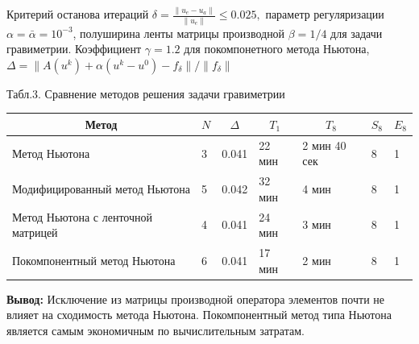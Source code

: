 \documentclass[10pt,pdf, mathserif, hyperref={unicode}]{beamer}
\begin{document}
\begin{frame}
	Критерий останова итераций 
	$\delta=\frac{\|u_e-u_a\|}{\|u_e\|}\le 0.025,$ параметр регуляризации $\alpha=\bar{\alpha}=10^{-3}$, полуширина ленты матрицы производной $\beta=1/4$ для задачи гравиметрии. Коэффициент $\gamma=1.2$ для покомпонетного метода Ньютона, $\Delta=\|A(u^k)+\alpha(u^k-u^0)-f_\delta\|/\|f_\delta\|$
	
	\begin{table}[]
		\centering
		\renewcommand{\arraystretch}{1.5}
		\scriptsize{Табл.3. Сравнение методов решения задачи гравиметрии}
		\label{table3.1}
		\begin{tabular}{|p{}|p{}|l|l|l|l|l|}
			\hline
			\multicolumn{1}{|c|}{Метод}        & \multicolumn{1}{c|}{$N$} &
			\multicolumn{1}{c|}{$\Delta$} & \multicolumn{1}{c|}{$T_1$} & \multicolumn{1}{c|}{$T_8$} &
			\multicolumn{1}{c|}{$S_8$} & \multicolumn{1}{c|}{$E_8$}
			\\ \hline
			Метод Ньютона                      &  3        & 0.041                          &       22 мин                  &     2 мин 40 сек &
			8 & 1 \\ \hline
			Модифицированный метод Ньютона     &         5           & 0.042            & 32 мин                  & 4 мин      &
			8 & 1             \\ \hline
			Метод Ньютона с ленточной матрицей &  4               & 0.041                    & 24 мин                  & 3 мин       & 8 & 1            \\ \hline
			Покомпонентный метод Ньютона &  6               & 0.041                    & 17 мин                  & 2 мин       & 8 & 1            \\ \hline
		\end{tabular}
	\end{table}
	\textbf{\color{blue}Вывод:} Исключение из матрицы производной оператора элементов почти не влияет на сходимость метода Ньютона. Покомпонентный метод типа Ньютона является самым экономичным по вычислительным затратам.
\end{frame}
%	
\end{document}
